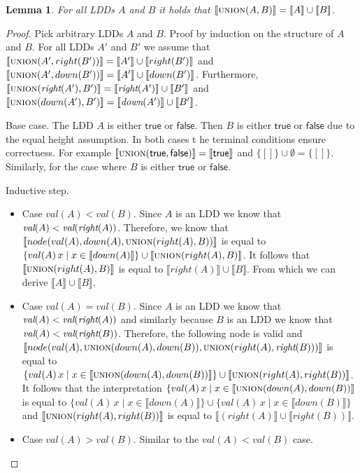 \documentclass{article}
\newtheorem{lemma}[theorem]{Lemma}
\newcommand{\var}[1]{\ensuremath{\textit{#1}}}
\newcommand{\interpret}[1]{\llbracket #1 \rrbracket}
\begin{document}
\begin{lemma}
	For all LDDs $A$ and $B$ it holds that $\interpret{\textsc{union}(A, B)} = \interpret{A} \cup \interpret{B}$.
\end{lemma}
\begin{proof}
	Pick arbitrary LDDs $A$ and $B$.
	Proof by induction on the structure of $A$ and $B$.	
	For all LDDs $A'$ and $B'$ we assume that $\interpret{\textsc{union}(A', right(B'))} = \interpret{A'} \cup \interpret{right(B')}$ and $\interpret{\textsc{union}(A', down(B'))} = \interpret{A'} \cup \interpret{down(B')}$.
	Furthermore, $\interpret{\textsc{union}(\var{right}(A'), B')} = \interpret{\var{right}(A')} \cup \interpret{B'}$ and $\interpret{\textsc{union}(down(A'), B')} = \interpret{\var{down}(A')} \cup \interpret{B'}$.
	
	Base case.
	The LDD $A$ is either $\textsf{true}$ or $\textsf{false}$.
	Then $B$ is either $\textsf{true}$ or $\textsf{false}$ due to the equal height assumption.
	In both cases t he terminal conditions ensure correctness.
	For example $\interpret{\textsc{union}(\textsf{true}, \textsf{false})} = \interpret{\textsf{true}}$ and $\{[]\} \cup \emptyset = \{[]\}$.	
	Similarly, for the case where $B$ is either $\textsf{true}$ or $\textsf{false}$.
	
	Inductive step.
	\begin{itemize}
	\item Case $val(A) < val(B)$.
		Since $A$ is an LDD we know that $\textit{val}(A) < \textit{val}(\textit{right}(A))$.
		Therefore, we know that $\interpret{node(val(A), down(A), \textsc{union}(right(A), B))}$ is equal to $\{val(A)\,x \mid x \in \interpret{down(A)}\} \cup \interpret{\textsc{union}(right(A), B)}$.
		It follows that $\interpret{\textsc{union}(right(A), B)}$ is equal to $\interpret{right(A)} \cup \interpret{B}$.
		From which we can derive $\interpret{A} \cup \interpret{B}$.

	\item Case $val(A) = val(B)$.
		Since $A$ is an LDD we know that $\textit{val}(A) < \textit{val}(\textit{right}(A))$ and similarly because $B$ is an LDD we know that $\textit{val}(A) < \textit{val}(\textit{right}(B))$.
		Therefore, the following node is valid and $\interpret{node(val(A), \textsc{union}(down(A), down(B)), \textsc{union}(right(A), \var{right}(B)))}$ is equal to  $\{val(A)\,x \mid x \in \interpret{\textsc{union}(down(A), down(B))}\} \cup \interpret{\textsc{union}(right(A), right(B))}$.
		It follows that the interpretation $\{val(A)\,x \mid x \in \interpret{\textsc{union}(down(A), down(B))}$ is equal to $\{val(A)\,x \mid x \in \interpret{down(A)}\} \cup \{val(A)\,x \mid x \in \interpret{down(B)}\}$ and $\interpret{\textsc{union}(right(A), right(B))}$ is equal to $\interpret{(right(A)} \cup \interpret{right(B))}$.
	
	\item Case $val(A) > val(B)$.
		Similar to the $val(A) < val(B)$ case.	\qedhere	
	\end{itemize} 
\end{proof}
\end{document}
